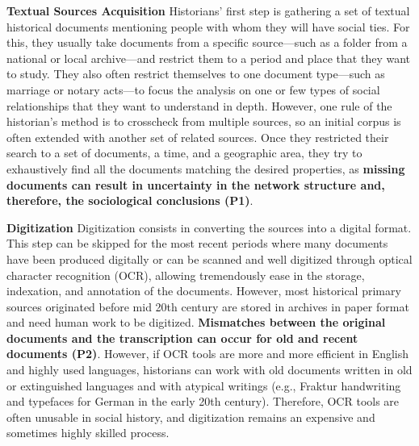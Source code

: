 \noindent\textbf{Textual Sources Acquisition}
Historians' first step is gathering a set of textual historical documents mentioning people with whom they will have social ties.
For this, they usually take documents from a specific source---such as a folder from a national or local archive---and restrict them to a period and place that they want to study.
They also often restrict themselves to one document type---such as marriage or notary acts---to focus the analysis on one or few types of social relationships that they want to understand in depth.
However, one rule of the historian's method is to crosscheck from multiple sources, so an initial corpus is often extended with another set of related sources.
Once they restricted their search to a set of documents, a time, and a geographic area, they try to exhaustively find all the documents matching the desired properties, as \textbf{missing documents can result in uncertainty in the network structure and, therefore, the sociological conclusions (P1)}.

\noindent\textbf{Digitization}
Digitization consists in converting the sources into a digital format.
This step can be skipped for the most recent periods where many documents have been produced digitally or can be scanned and well digitized through optical character recognition (OCR), allowing tremendously ease in the storage, indexation, and annotation of the documents.
However, most historical primary sources originated before mid 20th century are stored in archives in paper format and need human work to be digitized.
\textbf{Mismatches between the original documents and the transcription can occur for old and recent documents (P2)}.
However, if OCR tools are more and more efficient in English and highly used languages, historians can work with old documents written in old or extinguished languages and with atypical writings (e.g., Fraktur handwriting and typefaces for German in the early 20th century).
Therefore, OCR tools are often unusable in social history, and digitization remains an expensive and sometimes highly skilled process.

